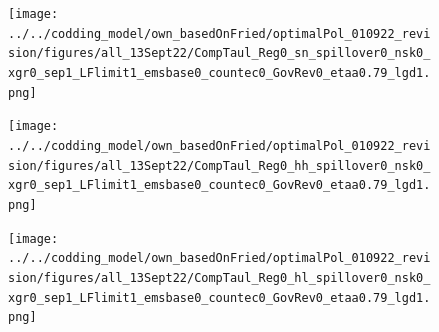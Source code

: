 \begin{figure}[h!!]
\begin{minipage}[]{0.32\textwidth}
\texttt{[image: ../../codding\_model/own\_basedOnFried/optimalPol\_010922\_revision/figures/all\_13Sept22/CompTaul\_Reg0\_sn\_spillover0\_nsk0\_xgr0\_sep1\_LFlimit1\_emsbase0\_countec0\_GovRev0\_etaa0.79\_lgd1.png]}
\end{minipage}	
\begin{minipage}[]{0.32\textwidth}
\texttt{[image: ../../codding\_model/own\_basedOnFried/optimalPol\_010922\_revision/figures/all\_13Sept22/CompTaul\_Reg0\_hh\_spillover0\_nsk0\_xgr0\_sep1\_LFlimit1\_emsbase0\_countec0\_GovRev0\_etaa0.79\_lgd1.png]}
\end{minipage}	
\begin{minipage}[]{0.32\textwidth}
\texttt{[image: ../../codding\_model/own\_basedOnFried/optimalPol\_010922\_revision/figures/all\_13Sept22/CompTaul\_Reg0\_hl\_spillover0\_nsk0\_xgr0\_sep1\_LFlimit1\_emsbase0\_countec0\_GovRev0\_etaa0.79\_lgd1.png]}
\end{minipage}
\end{figure}

